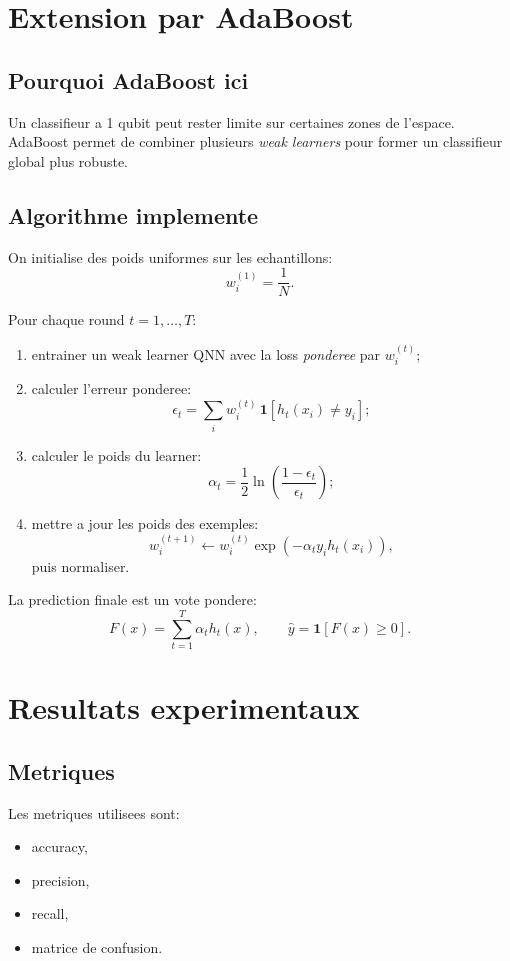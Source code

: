 \documentclass[11pt,a4paper]{article}
\begin{document}
\section{Extension par AdaBoost}
\subsection{Pourquoi AdaBoost ici}
Un classifieur a 1 qubit peut rester limite sur certaines zones de l'espace. AdaBoost permet de combiner plusieurs \emph{weak learners} pour former un classifieur global plus robuste.

\subsection{Algorithme implemente}
On initialise des poids uniformes sur les echantillons:
\[
w_i^{(1)} = \frac{1}{N}.
\]

Pour chaque round $t=1,\dots,T$:
\begin{enumerate}
  \item entrainer un weak learner QNN avec la loss \emph{ponderee} par $w_i^{(t)}$;
  \item calculer l'erreur ponderee:
  \[
  \epsilon_t = \sum_i w_i^{(t)}\,\mathbf{1}[h_t(x_i)\neq y_i];
  \]
  \item calculer le poids du learner:
  \[
  \alpha_t = \frac{1}{2}\ln\left(\frac{1-\epsilon_t}{\epsilon_t}\right);
  \]
  \item mettre a jour les poids des exemples:
  \[
  w_i^{(t+1)} \leftarrow w_i^{(t)}\exp\left(-\alpha_t y_i h_t(x_i)\right),
  \]
  puis normaliser.
\end{enumerate}

La prediction finale est un vote pondere:
\[
F(x) = \sum_{t=1}^T \alpha_t h_t(x),
\qquad
\hat y = \mathbf{1}[F(x)\ge 0].
\]

\section{Resultats experimentaux}
\subsection{Metriques}
Les metriques utilisees sont:
\begin{itemize}
  \item accuracy,
  \item precision,
  \item recall,
  \item matrice de confusion.
\end{itemize}
\end{document}
